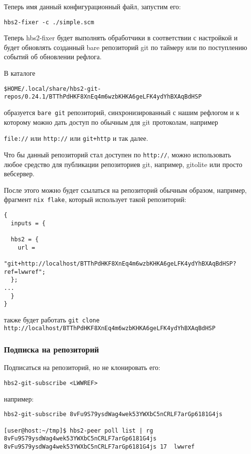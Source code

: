 \documentclass[11pt,a4paper]{article}
\begin{document}
Теперь имя данный конфигурационный файл, запустим его:

\begin{verbatim}
hbs2-fixer -c ./simple.scm
\end{verbatim}

Теперь hbs2-fixer будет выполнять обработчики в соответствии с настройкой и будет обновлять
созданный bare репозиторий git по таймеру или по поступлению событий об обновлении рефлога.

В каталоге

\texttt{\$HOME/.local/share/hbs2-git-repos/0.24.1/BTThPdHKF8XnEq4m6wzbKHKA6geLFK4ydYhBXAqBdHSP}

образуется \texttt{bare git} репозиторий, синхронизированный с нашим рефлогом и
к которому можно дать доступ по обычным для git протоколам, например

\texttt{file://} или \texttt{http://} или \texttt{git+http} и так далее.

Что бы данный репозиторий стал доступен по \texttt{http://}, можно использовать
любое средство для публикации репозиториев git, например, gitolite или просто вебсервер.

После этого можно будет ссылаться на репозиторий обычным образом, например,
фрагмент \texttt{nix flake}, который использует такой репозиторий:

\begin{verbatim}
{
  inputs = {

  hbs2 = {
    url =
      "git+http://localhost/BTThPdHKF8XnEq4m6wzbKHKA6geLFK4ydYhBXAqBdHSP?ref=lwwref";
  };
...
  }
}
\end{verbatim}

также будет работать \texttt{git clone http://localhost/BTThPdHKF8XnEq4m6wzbKHKA6geLFK4ydYhBXAqBdHSP}

\subsubsection{Подписка на репозиторий}

Подписаться на репозиторий, но не клонировать его:

\begin{verbatim}
hbs2-git-subscribe <LWWREF>
\end{verbatim}

например:

\begin{verbatim}
hbs2-git-subscribe 8vFu9S79ysdWag4wek53YWXbC5nCRLF7arGp6181G4js

[user@host:~/tmp]$ hbs2-peer poll list | rg  8vFu9S79ysdWag4wek53YWXbC5nCRLF7arGp6181G4js
8vFu9S79ysdWag4wek53YWXbC5nCRLF7arGp6181G4js 17  lwwref
\end{verbatim}
\end{document}
